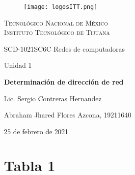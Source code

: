 \documentclass[stu, 12pt, letterpaper, donotrepeattitle, floatsintext, natbib]{apa7}
\begin{document}
    \begin{titlepage}
        \begin{figure}[ht]
            \centering
            \texttt{[image: logosITT.png]}
        \end{figure}
        \centering
        {\Large\scshape Tecnológico Nacional de México\\Instituto Tecnológico de Tijuana\par}
        \vspace{1cm}
        {\Large SCD-1021SC6C Redes de computadoras\par}
        \vspace{1cm}
        {\Large Unidad 1\par}
        \vspace{2cm}
        {\Large\bfseries Determinación de dirección de red\par}
        \vspace{2cm}
        {\large Lic. Sergio Contreras Hernandez\par}
        \vfill
            {\large Abraham Jhared Flores Azcona, 19211640\par}
        \vfill
        {\large 25 de febrero de 2021}
    \end{titlepage}

\renewcommand\contentsname{Contenido}

\newpage
\section*{Tabla 1}
\end{document}

